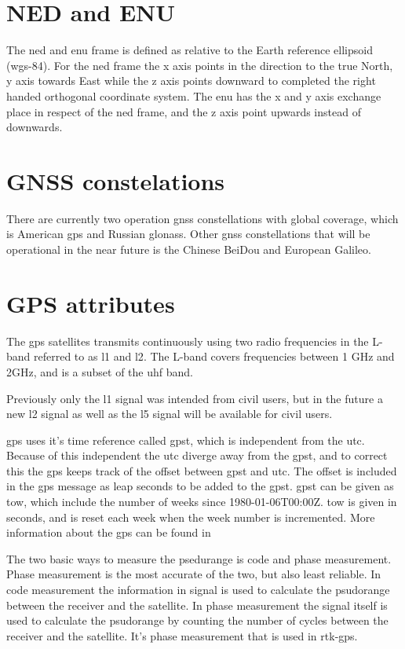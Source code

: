 \section{NED and ENU}
The \gls{ned} and \gls{enu} frame is defined as relative to the Earth reference ellipsoid (\gls{wgs-84}). For the \gls{ned} frame the x axis points in the direction to the true North, y axis towards East while the z axis points downward to completed the right handed orthogonal coordinate system. The \gls{enu} has the x and y axis exchange place in respect of the \gls{ned} frame, and the z axis point upwards instead of downwards.

\section{GNSS constelations}
There are currently two operation \gls{gnss} constellations with global coverage, which is American \gls{gps} and Russian \gls{glonass}. Other \gls{gnss} constellations that will be operational in the near future is the Chinese BeiDou and European Galileo.
\section{GPS attributes}
The \gls{gps} satellites transmits continuously using two radio frequencies in the L-band referred to as \gls{l1} and {l2}. The L-band covers frequencies between 1 GHz and 2GHz, and is a subset of the \gls{uhf} band.

Previously only the \gls{l1} signal was intended from civil users, but in the future a new {l2} signal as well as the \gls{l5} signal will be available for civil users. 

\gls{gps} uses it's time reference called \gls{gpst}, which is independent from the \gls{utc}. Because of this independent the \gls{utc} diverge away from the \gls{gpst}, and to correct this the \gls{gps} keeps track of the offset between \gls{gpst} and \gls{utc}. The offset is included in the \gls{gps} message as leap seconds to be added to the \gls{gpst}. \gls{gpst} can be given as \gls{tow}, which include the number of weeks since 1980-01-06T00:00Z. \gls{tow} is given in seconds, and is reset each week when the week number is incremented. More information about the \gls{gps} can be found in \citep{GPSBOOK,vik2014integrated} 

The two basic ways to measure the psedurange is code and phase measurement. Phase measurement is the most accurate of the two, but also least reliable.
In code measurement the information in signal is used to calculate the psudorange between the receiver and the satellite. In phase measurement the signal itself is used to calculate the psudorange by counting the number of cycles between the receiver and the satellite. It's phase measurement that is used in \gls{rtk-gps}.

